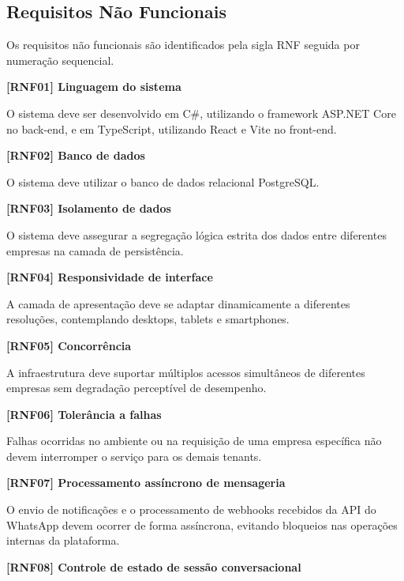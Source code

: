 \subsection{Requisitos Não Funcionais}
Os requisitos não funcionais são identificados pela sigla RNF seguida por numeração sequencial.

\vspace{\baselineskip}
\noindent\textbf{[RNF01] Linguagem do sistema}

O sistema deve ser desenvolvido em C\#, utilizando o framework ASP.NET Core no back-end, e em TypeScript, utilizando React e Vite no front-end.

\vspace{\baselineskip}
\noindent\textbf{[RNF02] Banco de dados}

O sistema deve utilizar o banco de dados relacional PostgreSQL.

\vspace{\baselineskip}
\noindent\textbf{[RNF03] Isolamento de dados}

O sistema deve assegurar a segregação lógica estrita dos dados entre diferentes empresas na camada de persistência.

\vspace{\baselineskip}
\noindent\textbf{[RNF04] Responsividade de interface}

A camada de apresentação deve se adaptar dinamicamente a diferentes resoluções, contemplando desktops, tablets e smartphones.

\vspace{\baselineskip}
\noindent\textbf{[RNF05] Concorrência}

A infraestrutura deve suportar múltiplos acessos simultâneos de diferentes empresas sem degradação perceptível de desempenho.

\vspace{\baselineskip}
\noindent\textbf{[RNF06] Tolerância a falhas}

Falhas ocorridas no ambiente ou na requisição de uma empresa específica não devem interromper o serviço para os demais tenants.

\vspace{\baselineskip}
\noindent\textbf{[RNF07] Processamento assíncrono de mensageria}

O envio de notificações e o processamento de webhooks recebidos da API do WhatsApp devem ocorrer de forma assíncrona, evitando bloqueios nas operações internas da plataforma.

\vspace{\baselineskip}
\noindent\textbf{[RNF08] Controle de estado de sessão conversacional}

